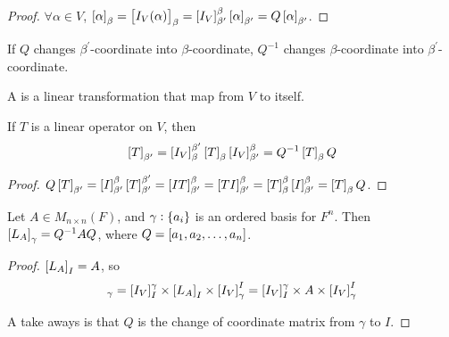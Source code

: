 \begin{proof}
    $\forall \alpha \in V $,  $\coordinate{\alpha}_\beta = \coordinate{I_V (\alpha)}_\beta =  \coordinate{I_V}_{\beta^\prime}^\beta \coordinate{\alpha}_{\beta^\prime} = Q \coordinate{\alpha}_{\beta^\prime}$.
\end{proof}

If $Q$ changes $\beta^\prime$-coordinate into $\beta$-coordinate, $Q^{-1}$ changes $\beta$-coordinate into $\beta^\prime$-coordinate.

\begin{definition}
	A  is a linear transformation that map from $V$ to itself.
\end{definition}

\begin{theorem}\label{twoindextransform}
	If $T$ is a linear operator on $V$, then
	\begin{equation}
		\coordinate{T}_{\beta^\prime} = \coordinate{I_V}_{\beta}^{\beta^\prime} \coordinate{T}_\beta \coordinate{I_V}_{\beta^\prime}^\beta= Q^{-1} \coordinate{T}_\beta Q 
	\end{equation}
\end{theorem}

\begin{proof}
    $Q \coordinate{T}_{\beta^\prime} = [I]_{\beta^\prime}^\beta \coordinate{T}_{\beta^\prime}^{\beta^\prime} = [I T]_{\beta^\prime}^\beta = [T I]_{\beta^\prime}^\beta = \coordinate{T}_\beta^\beta [I]_{\beta^\prime}^\beta = \coordinate{T}_\beta Q$.
\end{proof}

\begin{theorem}
    Let $A \in M_{n \times n} (F)$, and $\gamma:\set{a_i}$ is an ordered basis for $F^n$. Then $\coordinate{L_A}_\gamma = Q^{-1} A Q$, where $Q = \coordinate{a_1, a_2, \dots, a_n}$.
\end{theorem}

\begin{proof}
    $\coordinate{L_A}_I = A$, so
    \begin{equation*}
        [L_A]_\gamma = \coordinate{I_V}_I^\gamma \times \coordinate{L_A}_I \times \coordinate{I_V}_\gamma^I = \coordinate{I_V}_I^\gamma \times A \times \coordinate{I_V}_\gamma^I
    \end{equation*}
    
    A take aways is that $Q$ is the change of coordinate matrix from $\gamma$ to $I$.
\end{proof}


